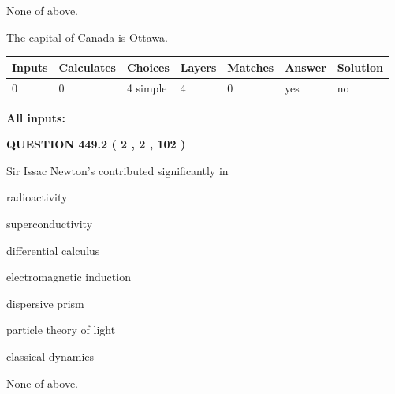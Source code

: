 \documentclass[12pt]{article}
\begin{document}
 
 None of above.
 
 
\noindent{}
 
 
The capital of Canada is Ottawa.
 
 
\noindent{}
 
 
   
   
   
   
\noindent\begin{tabular}{|l|l|l|l|l|l|l|}
 \hline
Inputs & Calculates & Choices & Layers & Matches & Answer & Solution \\ \hline
 0  & 
 0  & 
 4
  simple  
  & 
 4  & 
 0  & 
  yes & 
  no 
  \\ \hline
 \end{tabular}
   
   
   
   
\noindent{}
   
   
   
   
\noindent\vspace{0.1in}\hspace{-0.08in} {\textbf{\Large{All inputs: }}}
   
   
  
\vspace{0.2in}
  
{\textbf{\Large{QUESTION
449.2 
 ( 2 , 2 , 102 )
}}}
  
  
Sir Issac Newton's contributed significantly in
 
 
radioactivity
 
 
superconductivity
 
 
differential calculus
 
 
electromagnetic induction
 
 
dispersive prism
 
 
particle theory of light
 
 
classical dynamics
 
 
 None of above.
 
 
\noindent{}
 
\end{document}
